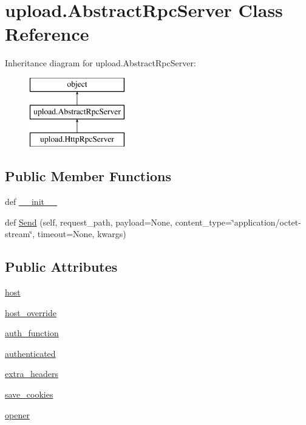 \hypertarget{classupload_1_1_abstract_rpc_server}{}\section{upload.\+Abstract\+Rpc\+Server Class Reference}
\label{classupload_1_1_abstract_rpc_server}
Inheritance diagram for upload.\+Abstract\+Rpc\+Server\+:\begin{figure}[H]
\begin{center}
\leavevmode
\includegraphics[height=3.000000cm]{classupload_1_1_abstract_rpc_server}
\end{center}
\end{figure}
\subsection*{Public Member Functions}
\begin{DoxyCompactItemize}
\item 
def \hyperlink{classupload_1_1_abstract_rpc_server_a87618fdb401f36dd7aaf2196bb65d35e}{\+\_\+\+\_\+init\+\_\+\+\_\+}
\item 
def \hyperlink{classupload_1_1_abstract_rpc_server_ac1b913f8bd00da4741c47ab49ea94cb5}{Send} (self, request\+\_\+path, payload=None, content\+\_\+type=\char`\"{}application/octet-\/stream\char`\"{}, timeout=None, kwargs)
\end{DoxyCompactItemize}
\subsection*{Public Attributes}
\begin{DoxyCompactItemize}
\item 
\hyperlink{classupload_1_1_abstract_rpc_server_ab7188d827e2faddcf970f524f5856192}{host}
\item 
\hyperlink{classupload_1_1_abstract_rpc_server_a783a4a7e4ffb776a57a3f267300a213b}{host\+\_\+override}
\item 
\hyperlink{classupload_1_1_abstract_rpc_server_aee0090a3bcf07b913a7dd596a5dabb8f}{auth\+\_\+function}
\item 
\hyperlink{classupload_1_1_abstract_rpc_server_a692955750c802e461c6336d3000cd365}{authenticated}
\item 
\hyperlink{classupload_1_1_abstract_rpc_server_adbbf0109afc13d58d7815fa143cb779f}{extra\+\_\+headers}
\item 
\hyperlink{classupload_1_1_abstract_rpc_server_affe342205c4647d41b127f5a5634858b}{save\+\_\+cookies}
\item 
\hyperlink{classupload_1_1_abstract_rpc_server_aa931446476e0e86f3ade7fef0a0aea5a}{opener}
\end{DoxyCompactItemize}


